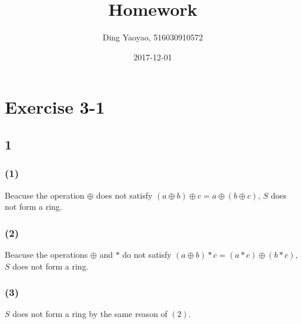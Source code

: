 \documentclass[draft]{article}
\title{Homework}
\date{2017-12-01}
\author{Ding Yaoyao, 516030910572}
\begin{document}
	\maketitle
	\section*{Exercise 3-1}
		\subsection*{1}
			\subsubsection*{(1)}
				Beacuse the operation $\oplus$ does not satisfy $(a\oplus b)\oplus c = a
				\oplus (b \oplus c)$, $S$ does not form a ring.
			\subsubsection*{(2)}
				Beacuse the operations $\oplus$ and $*$ do not satisfy $(a\oplus b)*c =
				(a*c)\oplus(b*c)$, $S$ does not form a ring.
			\subsubsection*{(3)}
				$S$ does not form a ring by the same reason of $(2)$.
\end{document}
